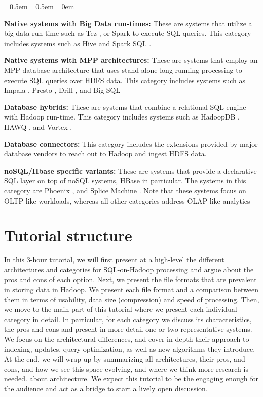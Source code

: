 \documentclass{vldb}
\newcounter{mycounter}
\begin{document}
\vspace{-2mm}
\setcounter{mycounter}{0}
\begin{list}{.}{\leftmargin=1.4em}
  \itemsep=0.5em
  \parsep=0.5em
  \parskip=0em
\item {{\bf Native systems with Big Data run-times:} These are systems that utilize a big data run-time such as Tez \cite{tezsigmod15}, or Spark \cite{sparkhotcloud10} to execute SQL queries. This category includes systems such as Hive \cite{hive} and Spark SQL \cite{sparkSQL}.}
\item{ {\bf Native systems with MPP architectures:} These are systems that employ an MPP database architecture that uses stand-alone long-running processing to execute SQL queries over HDFS data. This category includes systems such as Impala \cite{Kornacker+15}, Presto \cite{prestofcb}, Drill \cite{drill}, and Big SQL \cite{bigsql}}
\item{{\bf Database hybrids:} These are systems that combine a relational SQL engine with Hadoop run-time. This category includes systems such as HadoopDB \cite{hadoopdb}, HAWQ \cite{hawq}, and Vortex \cite{vortex}.}
\item{ {\bf Database connectors:} This category includes the extensions provided by major database vendors to reach out to Hadoop and ingest HDFS data.}
\item{ {\bf noSQL/Hbase specific variants:} These are systems that provide a declarative SQL layer on top of noSQL systems, HBase in particular. The systems in this category are Phoenix \cite{phoenix}, and Splice Machine \cite{splice}. Note that these systems focus on OLTP-like workloads, whereas all other categories address OLAP-like analytics}
\end{list}

\section{Tutorial structure}

In this 3-hour tutorial, we will first present at a high-level the different architectures and categories for SQL-on-Hadoop processing and argue about the pros and cons of each option.
Next, we present the file formats that are prevalent in storing data in Hadoop. We present each file format and a comparison between them in terms of usability, data size (compression) and speed of processing. Then, we move to the main part of this tutorial where we present each individual category in detail. In particular, for each category we discuss its characteristics, the pros and cons and present in more detail one or two representative systems.
We focus on the architectural differences, and cover in-depth their approach to indexing, updates, query optimization, as well as new algorithms they introduce.
At the end, we will wrap up by summarizing all architectures, their pros, and cons, and how we see this space evolving, and where we think more research is needed.
about architecture. 
We expect this tutorial to be the engaging enough for the audience and act as a bridge to start a lively open discussion.  
\end{document}

